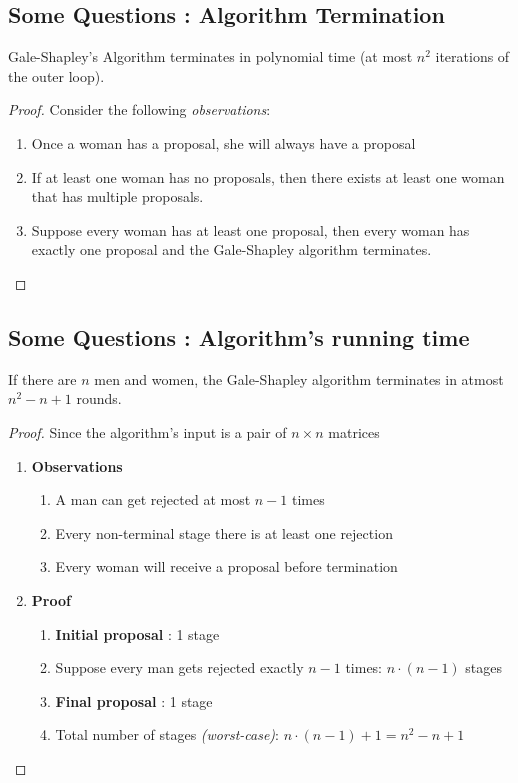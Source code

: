 \subsection{Some Questions : Algorithm Termination}

\begin{theorem}\label{thm_1_1}
Gale-Shapley's Algorithm terminates in polynomial time (at most $n^2$ iterations of the outer loop).
\end{theorem}

\begin{proof}
Consider the following \textit{observations}:
\begin{enumerate}
\item Once a woman has a proposal, she will always have a proposal
\item If at least one woman has no proposals, then there exists at least one woman that has
multiple proposals.
\item Suppose every woman has at least one proposal, then every woman has exactly one
proposal and the Gale-Shapley algorithm terminates.
\end{enumerate}
\end{proof}

\subsection{Some Questions : Algorithm's running time}\label{thm_1_2}

\begin{theorem}
    If there are $n$ men and women, the Gale-Shapley algorithm terminates in atmost $n^2 - n + 1$ rounds.
\end{theorem}

\begin{proof}
    Since the algorithm’s input is a pair of $n \times n$ matrices
    \begin{enumerate}
        \item \textbf{Observations}
        \begin{enumerate}
            \item A man can get rejected at most $n-1$ times
            \item Every non-terminal stage there is at least one rejection
            \item Every woman will receive a proposal before termination
        \end{enumerate}
           
        \item \textbf{Proof}
        \begin{enumerate}
            \item \textbf{Initial proposal} : 1 stage
            \item Suppose every man gets rejected exactly $n-1$ times: $n\cdot(n-1)$ stages
            \item \textbf{Final proposal} : 1 stage
            \item Total number of stages \textit{(worst-case)}: ${n\cdot(n-1)}+1 = n^2-n+1$
        \end{enumerate}
    \end{enumerate}
\end{proof}

